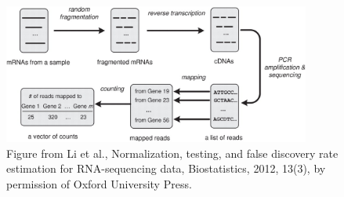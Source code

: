 \begin{figure}
  \centering
  \includegraphics[width=0.9\textwidth]{pics/li-biostats12.jpg}
  \caption{Figure from Li et al., Normalization, testing, and false discovery rate estimation for RNA-sequencing data, Biostatistics, 2012, 13(3), by permission of Oxford University Press.}
  \label{fig:li-biostats}
\end{figure}


